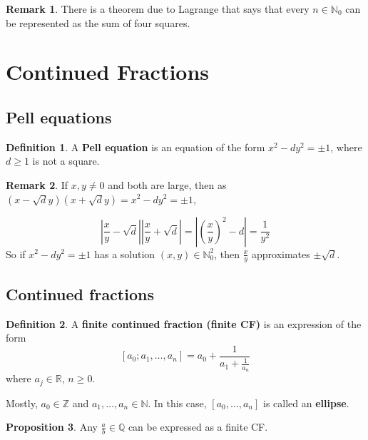\documentclass[12pt,a4paper]{article}
\theoremstyle{definition}
\newtheorem{definition}{Definition}[subsection]
\newtheorem{proposition}[definition]{Proposition}
\newtheorem*{remark}{Remark}
\begin{document}
\begin{remark}
	There is a theorem due to Lagrange that says that every $n \in \mathbb{N}_0$ can be represented as the sum of four squares.
\end{remark}

\section{Continued Fractions}

\subsection{Pell equations}

\begin{definition}
	A \textbf{Pell equation} is an equation of the form $x^2 - dy^2 = \pm 1$, where $d \ge 1$ is not a square.
\end{definition}

\begin{remark}
	If $x, y \ne 0$ and both are large, then as $(x - \sqrt{d}y)(x + \sqrt{d}y) = x^2 - dy^2 = \pm 1$,
	
	\[ \left| \frac{x}{y} - \sqrt{d} \right| \left| \frac{x}{y} + \sqrt{d} \right| = \left| \left( \frac{x}{y} \right)^2 - d \right| = \frac{1}{y^2} \]
	So if $x^2 - dy^2 = \pm 1$ has a solution $(x, y) \in \mathbb{N}_0^2$, then $\frac{x}{y}$ approximates $\pm \sqrt{d}$.
\end{remark}

\subsection{Continued fractions}

\begin{definition}
	A \textbf{finite continued fraction (finite CF)} is an expression of the form
	\[ [a_0; a_1, \ldots, a_n] = a_0 + \frac{1}{a_1 + \frac{1}{a_n}} \]
	where $a_j \in \mathbb{R}$, $n \ge 0$.

	Mostly, $a_0 \in \mathbb{Z}$ and $a_1, \ldots, a_n \in \mathbb{N}$. In this case, $[a_0, \ldots, a_n]$ is called an \textbf{ellipse}.
\end{definition}

\begin{proposition}
	Any $\frac{a}{b} \in \mathbb{Q}$ can be expressed as a finite CF.
\end{proposition}
\end{document}
